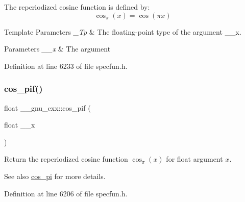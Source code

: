 The reperiodized cosine function is defined by\+: \[ \cos_\pi(x) = \cos(\pi x) \]


\begin{DoxyTemplParams}{Template Parameters}
{\em \+\_\+\+Tp} & The floating-\/point type of the argument {\ttfamily \+\_\+\+\_\+x}. \\
\hline
\end{DoxyTemplParams}

\begin{DoxyParams}{Parameters}
{\em \+\_\+\+\_\+x} & The argument \\
\hline
\end{DoxyParams}


Definition at line 6233 of file specfun.\+h.

\mbox{\label{group__gnu__math__spec__func_gaddcae99c1572af6fa1d79b9cfa053033}} 
\subsubsection{\texorpdfstring{cos\+\_\+pif()}{cos\_pif()}}
{\footnotesize\ttfamily float \+\_\+\+\_\+gnu\+\_\+cxx\+::cos\+\_\+pif (\begin{DoxyParamCaption}\item[{float}]{\+\_\+\+\_\+x }\end{DoxyParamCaption})\hspace{0.3cm}{\ttfamily [inline]}}

Return the reperiodized cosine function $ \cos_\pi(x) $ for {\ttfamily float} argument $ x $.

\begin{DoxySeeAlso}{See also}
\hyperlink{group__gnu__math__spec__func_gafc4698ae591b0e9e61285b0794d43ef4}{cos\+\_\+pi} for more details. 
\end{DoxySeeAlso}


Definition at line 6206 of file specfun.\+h.

\mbox{\label{group__gnu__math__spec__func_ga9b6816c0abf30fd88417d79a33cb5465}} 
